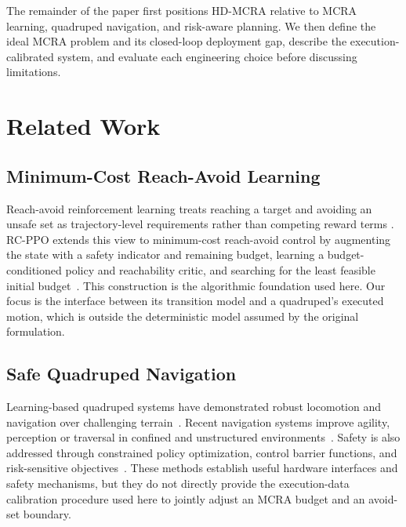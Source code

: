 \documentclass{article}
\begin{document}
The remainder of the paper first positions HD-MCRA relative to MCRA learning,
quadruped navigation, and risk-aware planning. We then define the ideal MCRA
problem and its closed-loop deployment gap, describe the execution-calibrated
system, and evaluate each engineering choice before discussing limitations.

\section{Related Work}
\subsection{Minimum-Cost Reach-Avoid Learning}
Reach-avoid reinforcement learning treats reaching a target and avoiding an unsafe
set as trajectory-level requirements rather than competing reward terms
\citep{bansal2017,ganai2023}. RC-PPO extends this view to minimum-cost reach-avoid
control by augmenting the state with a safety indicator and remaining budget,
learning a budget-conditioned policy and reachability critic, and searching for the
least feasible initial budget~\citep{so2024}. This construction is the algorithmic
foundation used here. Our focus is the interface between its transition model and a
quadruped's executed motion, which is outside the deterministic model assumed by
the original formulation.

\subsection{Safe Quadruped Navigation}
Learning-based quadruped systems have demonstrated robust locomotion and navigation
over challenging terrain~\citep{hwangbo2019,lee2020,kumar2021,miki2022,hoeller2024}.
Recent navigation systems improve agility, perception or traversal in confined and
unstructured environments~\citep{miki2024,weerakoon2024,guerrier2024}. Safety is
also addressed through constrained policy optimization, control barrier functions,
and risk-sensitive objectives~\citep{achiam2017,liu2022cvpo,renganathan2023}.
These methods establish useful hardware interfaces and safety mechanisms, but they
do not directly provide the execution-data calibration procedure used here to
jointly adjust an MCRA budget and an avoid-set boundary.
\end{document}
